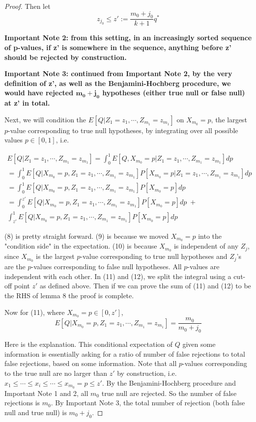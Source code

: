 \documentclass[12pt]{article}
\theoremstyle{plain}
\theoremstyle{definition}
\theoremstyle{remark}
\begin{document}
\begin{proof}
Then let\[
z_{j_0}\leq z':=\frac{m_0+j_0}{k+1}q^*
\]

\textbf{Important Note 2: from this setting, in an increasingly sorted sequence of p-values, if z' is somewhere in the sequence, anything before z' should be rejected by construction.}

\textbf{Important Note 3: continued from Important Note 2, by the very definition of z', as well as the Benjamini-Hochberg procedure, we would have rejected $\mathbf{m_0+j_0}$ hypotheses (either true null or false null) at z' in total.}

Next, we will condition the $E[Q|Z_1=z_1,\cdots,Z_{m_1}=z_{m_1}]$ on $X_{m_0}=p$, the largest $p$-value corresponding to true null hypotheses, by integrating over all possible values $p\in[0,1]$, i.e. 

\begin{gather}
E[Q|Z_1=z_1,\cdots,Z_{m_1}=z_{m_1}]=\int_0^1 E[Q,X_{m_0}=p|Z_1=z_1,\cdots,Z_{m_1}=z_{m_1}]dp\\
=\int_0^1E[Q|X_{m_0}=p,Z_1=z_1,\cdots,Z_{m_1}=z_{m_1}]P[X_{m_0}=p|Z_1=z_1,\cdots,Z_{m_1}=z_{m_1}]dp\\
=\int_0^1E[Q|X_{m_0}=p,Z_1=z_1,\cdots,Z_{m_1}=z_{m_1}]P[X_{m_0}=p]dp\\
=\int_0^{z'}E[Q|X_{m_0}=p,Z_1=z_1,\cdots,Z_{m_1}=z_{m_1}]P[X_{m_0}=p]dp\;+\\\int_{z'}^1E[Q|X_{m_0}=p,Z_1=z_1,\cdots,Z_{m_1}=z_{m_1}]P[X_{m_0}=p]dp
\end{gather}

(8) is pretty straight forward. (9) is because we moved $X_{m_0}=p$ into the "condition side" in the expectation. (10) is because $X_{m_0}$ is independent of any $Z_j$, since $X_{m_0}$ is the largest $p$-value corresponding to true null hypotheses and $Z_j$'s are the $p$-values corresponding to false null hypotheses. All $p$-values are independent with each other. In (11) and (12), we split the integral using a cut-off point $z'$ as defined above. Then if we can prove the sum of (11) and (12) to be the RHS of lemma 8 the proof is complete.

Now for (11), where $X_{m_0}=p\in [0,z']$, $$E[Q|X_{m_0}=p,Z_1=z_1,\cdots,Z_{m_1}=z_{m_1}]=\frac{m_0}{m_0+j_0}$$

Here is the explanation. This conditional expectation of $Q$ given some information is essentially asking for a ratio of number of false rejections to total false rejections, based on some information. Note that all $p$-values corresponding to the true null are no larger than $z'$ by construction, i.e. $x_1\leq \cdots\leq x_i\leq \cdots\leq x_{m_0}=p\leq z'$. By the Benjamini-Hochberg procedure and Important Note 1 and 2, all $m_0$ true null are rejected. So the number of false rejections is $m_0$. By Important Note 3, the total number of rejection (both false null and true null) is $m_0+j_0$. 


\end{proof}
\end{document}
